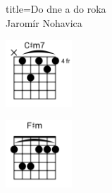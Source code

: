 \begin{song}{title=\predtitle\centering Do dne a do roka \\ \large Jaromír Nohavica \vspace*{-0.3cm}}
\begin{centerjustified}
\begin{varwidth}{0.38\textwidth}
	\includegraphics[width=2.5cm]{../Akordy/cxm7.png}
	
	\includegraphics[width=2.5cm]{../Akordy/fxm.png}
\end{varwidth}

\end{centerjustified}
\setcounter{Slokočet}{0}
\end{song}
